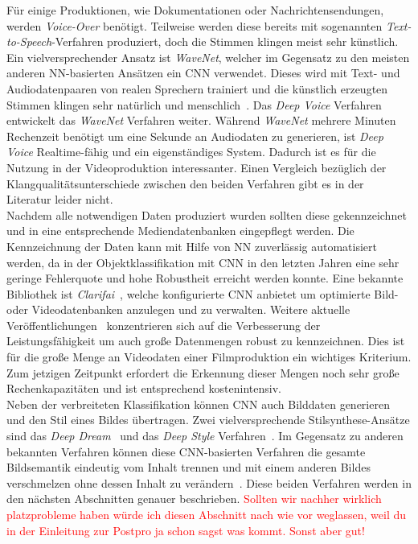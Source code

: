 \documentclass[times, 11pt,twocolumn]{article}
\begin{document}
 \label{sec:SOTAPostproduktion}
Für einige Produktionen, wie Dokumentationen oder Nachrichtensendungen, werden \textit{Voice-Over} benötigt. Teilweise werden diese bereits mit sogenannten \textit{Text-to-Speech}-Verfahren produziert, doch die Stimmen klingen meist sehr künstlich.\\
Ein vielversprechender Ansatz ist \textit{WaveNet}, welcher im Gegensatz zu den meisten anderen NN-basierten Ansätzen ein CNN verwendet. Dieses wird mit Text- und Audiodatenpaaren von realen Sprechern trainiert und die künstlich erzeugten Stimmen klingen sehr natürlich und menschlich~\cite{OordDZSVGKSK16}. Das \textit{Deep Voice} Verfahren~\cite{DeepVoice} entwickelt das \textit{WaveNet} Verfahren weiter. Während \textit{WaveNet} mehrere Minuten Rechenzeit benötigt um eine Sekunde an Audiodaten zu generieren, ist \textit{Deep Voice} Realtime-fähig und ein eigenständiges System. Dadurch ist es für die Nutzung in der Videoproduktion interessanter. Einen Vergleich bezüglich der Klangqualitätsunterschiede zwischen den beiden Verfahren gibt es in der Literatur leider nicht.
\\
Nachdem alle notwendigen Daten produziert wurden sollten diese gekennzeichnet und in eine entsprechende Mediendatenbanken eingepflegt werden. Die Kennzeichnung der Daten kann mit Hilfe von NN zuverlässig automatisiert werden, da in der Objektklassifikation mit CNN in den letzten Jahren eine sehr geringe Fehlerquote und hohe Robustheit erreicht werden konnte. Eine bekannte Bibliothek ist \textit{Clarifai}~\cite{MITReview}, welche konfigurierte CNN anbietet um optimierte Bild- oder Videodatenbanken anzulegen und zu verwalten.  Weitere aktuelle Veröffentlichungen~\cite{Ng_VideoLabelling}\cite{Ye:VideoLabelling}\cite{KangEABZ17} konzentrieren sich auf die Verbesserung der Leistungsfähigkeit um auch große Datenmengen robust zu kennzeichnen. Dies ist für die große Menge an Videodaten einer Filmproduktion ein wichtiges Kriterium. Zum jetzigen Zeitpunkt erfordert die Erkennung dieser Mengen noch sehr große Rechenkapazitäten und ist entsprechend kostenintensiv. \\

Neben der verbreiteten Klassifikation können CNN auch Bilddaten generieren und den Stil eines Bildes übertragen. Zwei vielversprechende Stilsynthese-Ansätze sind das \textit{Deep Dream}~\cite{DeepDream} und das \textit{Deep Style} Verfahren~\cite{GatysEB15a}. Im Gegensatz zu anderen bekannten Verfahren können diese CNN-basierten Verfahren die gesamte Bildsemantik eindeutig vom Inhalt trennen und mit einem anderen Bildes verschmelzen ohne dessen Inhalt zu verändern~\cite{McCaigDG16}. Diese beiden Verfahren werden in den nächsten Abschnitten genauer beschrieben. \textcolor{red}{Sollten wir nachher wirklich platzprobleme haben würde ich diesen Abschnitt nach wie vor weglassen, weil du in der Einleitung zur Postpro ja schon sagst was kommt. Sonst aber gut!}
\end{document}
